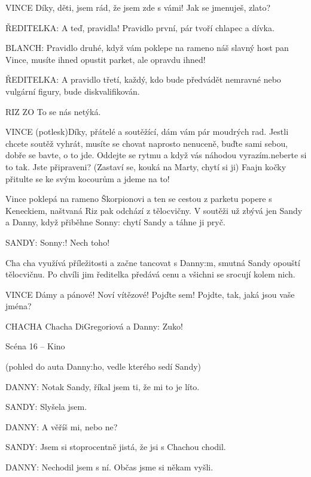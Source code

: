VINCE        Díky, děti, jsem rád, že jsem zde s vámi! Jak se jmenuješ, zlato? 

\rep ŘEDITELKA:        A teď, pravidla!         Pravidlo první, pár tvoří chlapec a dívka. 

\rep BLANCH:            Pravidlo druhé, když vám poklepe na rameno náš slavný host pan Vince, musíte ihned opustit parket, ale opravdu ihned! 

\rep ŘEDITELKA:        A pravidlo třetí, každý, kdo bude předvádět nemravné nebo vulgární         figury, bude diskvalifikován. 

RIZ        ZO        To se nás netýká. 

VINCE        (potlesk)Díky, přátelé a soutěžící, dám vám pár moudrých rad. Jestli                 chcete soutěž vyhrát, musíte se chovat naprosto nenuceně, buďte sami         sebou, dobře se bavte, o to jde. Oddejte se rytmu a když vás náhodou         vyrazím.neberte si to tak. Jste  připraveni? (Zastaví se, kouká na Marty,         chytí si ji) Faajn kočky přitulte se ke svým kocourům a jdeme na to!

Vince poklepá na rameno Škorpionovi a ten se cestou z parketu popere s Keneckiem, naštvaná Riz pak odchází z tělocvičny. V soutěži už zbývá jen Sandy a Danny, když přiběhne \rep Sonny: chytí Sandy a táhne ji pryč.

\rep SANDY:        \rep Sonny:! Nech toho!

Cha cha využívá příležitosti a začne tancovat s \rep Danny:m, smutná Sandy opouští tělocvičnu. Po chvíli jim ředitelka předává cenu a všichni se srocují kolem nich. 

VINCE        Dámy a pánové! Noví vítězové! Pojďte sem! Pojdte, tak, jaká jsou vaše         jména?

CHACHA        Chacha DiGregoriová a \rep Danny: Zuko!





Scéna 16  – Kino 

(pohled do auta \rep Danny:ho, vedle kterého sedí Sandy)

\rep DANNY:        Notak Sandy, říkal jsem ti, že mi to je líto. 

\rep SANDY:        Slyšela jsem. 

\rep DANNY:        A věříš mi, nebo ne?

\rep SANDY:        Jsem si stoprocentně jistá, že jsi s Chachou chodil. 

\rep DANNY:        Nechodil jsem s ní. Občas jsme si někam vyšli.

